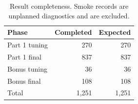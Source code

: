 \begin{table}[t]
\centering
\caption{Result completeness. Smoke records are unplanned diagnostics and are excluded.}
\label{tab:completeness}
\small
\begin{tabular}{lrr}
\toprule
Phase & Completed & Expected \\
\midrule
Part 1 tuning & 270 & 270 \\
Part 1 final & 837 & 837 \\
Bonus tuning & 36 & 36 \\
Bonus final & 108 & 108 \\
\midrule
Total & 1,251 & 1,251 \\
\bottomrule
\end{tabular}
\end{table}
